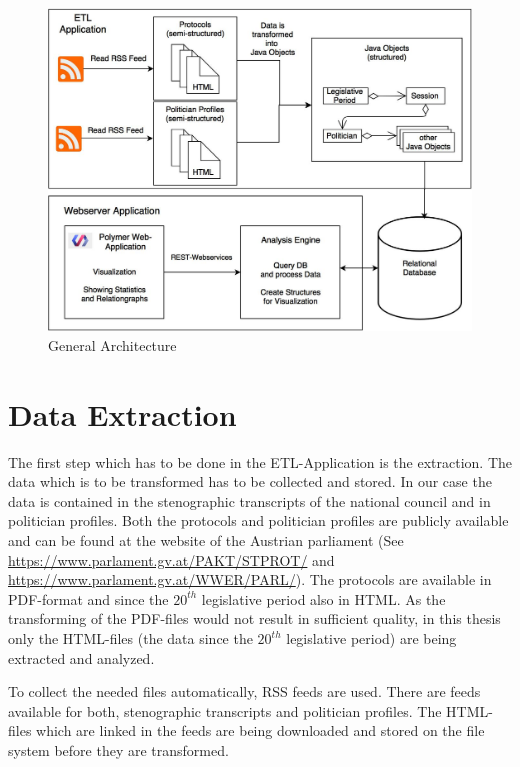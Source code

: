 \begin{figure}
	\centering
	\includegraphics[width=\textwidth]{imgs/overall_architecture}
	\caption{General Architecture}
	\label{fig:general_architecture}
\end{figure}

\section{Data Extraction}
\label{sec:data_extraction}
The first step which has to be done in the ETL-Application is the extraction. The data which is to be transformed has to be collected and stored. In our case the data is contained in the stenographic transcripts of the national council and in politician profiles. Both the protocols and politician profiles are publicly available and can be found at the website of the Austrian parliament (See \url{https://www.parlament.gv.at/PAKT/STPROT/} and \url{https://www.parlament.gv.at/WWER/PARL/}). The protocols are available in PDF-format and since the $20^{th}$ legislative period also in HTML. As the transforming of the PDF-files would not result in sufficient quality, in this thesis only the HTML-files (the data since the $20^{th}$ legislative period) are being extracted and analyzed.

To collect the needed files automatically, RSS feeds are used. There are feeds available for both, stenographic transcripts and politician profiles. The HTML-files which are linked in the feeds are being downloaded and stored on the file system before they are transformed.

